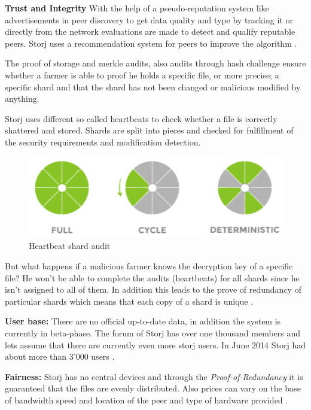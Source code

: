 \textbf{Trust and Integrity} With the help of a pseudo-reputation system like advertisements in peer discovery to get data quality and type by tracking it or directly from the network evaluations are made to detect and qualify reputable peers. Storj uses a recommendation system for peers to improve the algorithm \cite{storj:PDF}.

The proof of storage and merkle audits, also audits through hash challenge ensure whether a farmer is able to proof he holds a specific file, or more precise; a specific shard and that the shard has not been changed or malicious modified by anything.

Storj uses different so called heartbeats to check whether a file is correctly shattered and stored. Shards are split into pieces and checked for fulfillment of the security requirements and modification detection. 

	\begin{figure}[ht]
		\begin{center}
		\includegraphics[scale=0.8]{Talk5/storj_heartbeat.PNG}
		\end{center}
		\caption{Heartbeat shard audit \cite{storj:PDF}}
		\label{storj_heartbeat}
	\end{figure}

But what happens if a malicious farmer knows the decryption key of a specific file? He won't be able to complete the audits (heartbeats) for all shards since he isn't assigned to all of them. In addition this leads to the prove of redundancy of particular shards which means that each copy of a shard is unique \cite{storj:PDF}.

\textbf{User base:} There are no official up-to-date data, in addition the system is currently in beta-phase. The forum of Storj has over one thousand members \cite{storj:forum} and lets assume that there are currently even more storj users. In June 2014 Storj had about more than 3'000 users \cite{storj:crowdsale}.

\textbf{Fairness:} Storj has no central devices and through the \textit{Proof-of-Redundancy} it is guaranteed that the files are evenly distributed. Also prices can vary on the base of bandwidth speed and location of the peer and type of hardware provided \cite{storj:PDF}.

